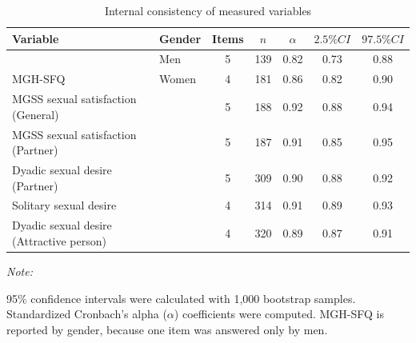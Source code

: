 \documentclass[
  bookmarksnumbered]{article}
\newenvironment{Shaded}{\begin{snugshade}}{\end{snugshade}}
\newcommand{\AttributeTok}[1]{\textcolor[rgb]{0.80,0.80,0.80}{#1}}
\newcommand{\ConstantTok}[1]{\textcolor[rgb]{0.86,0.64,0.64}{\textbf{#1}}}
\newcommand{\FunctionTok}[1]{\textcolor[rgb]{0.94,0.94,0.56}{#1}}
\newcommand{\NormalTok}[1]{\textcolor[rgb]{0.80,0.80,0.80}{#1}}
\newcommand{\SpecialCharTok}[1]{\textcolor[rgb]{0.86,0.64,0.64}{#1}}
\newcommand{\StringTok}[1]{\textcolor[rgb]{0.80,0.58,0.58}{#1}}
\begin{document}
\begin{Shaded}
\end{Shaded}

\begin{table}[H]

\caption{\label{tab:Cronbach-tab}Internal consistency of measured variables}
\centering
\begin{threeparttable}
\begin{tabular}[t]{llccccc}
\toprule
Variable & Gender & Items & $n$ & $\alpha$ & $2.5\% CI$ & $97.5\% CI$\\
\midrule
 & Men & 5 & 139 & 0.82 & 0.73 & 0.88\\
\cmidrule{2-7}
\multirow{-2}{*}{\raggedright\arraybackslash MGH-SFQ} & Women & 4 & 181 & 0.86 & 0.82 & 0.90\\
\cmidrule{1-7}
MGSS sexual satisfaction (General) &  & 5 & 188 & 0.92 & 0.88 & 0.94\\
\cmidrule{1-7}
MGSS sexual satisfaction (Partner) &  & 5 & 187 & 0.91 & 0.85 & 0.95\\
\cmidrule{1-7}
Dyadic sexual desire (Partner) &  & 5 & 309 & 0.90 & 0.88 & 0.92\\
\cmidrule{1-7}
Solitary sexual desire &  & 4 & 314 & 0.91 & 0.89 & 0.93\\
\cmidrule{1-7}
Dyadic sexual desire (Attractive person) &  & 4 & 320 & 0.89 & 0.87 & 0.91\\
\bottomrule
\end{tabular}
\begin{tablenotes}[para]
\item \textit{Note: } 
\item 95\% confidence intervals were calculated with 1,000 bootstrap samples.
           Standardized Cronbach's alpha ($\alpha$) coefficients were computed. 
           MGH-SFQ is reported by gender, because one item was answered only by men.
\end{tablenotes}
\end{threeparttable}
\end{table}
\end{document}
